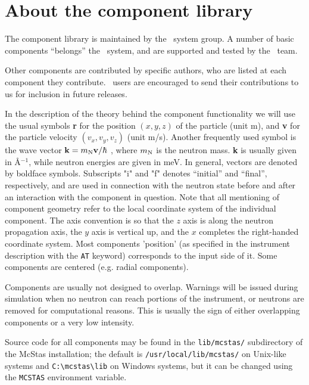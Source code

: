 
\chapter{About the component library}
\label{c:components}
The component library is
maintained by the \MCS\ system group. A number of basic components
``belongs'' the \MCS\ system, and are supported and tested by the \MCS\
team.

Other components are contributed
by specific authors, who are listed at each component
they contribute.
\MCS\ users are encouraged to send their
contributions to us for inclusion in future releases.

In the description of the theory behind the component functionality
we will use the usual symbols {\bf r} for the position
$(x,y,z)$ of the particle (unit m), and {\bf v} for
the particle velocity $(v_x, v_y, v_z)$ (unit m/s).
Another frequently used symbol is
the wave vector ${\bf k} = m_{\rm N} {\bf v}/\hbar$ , where
$m_{\rm N}$ is the neutron mass. {\bf k} is usually given in
\AA$^{-1}$, while neutron energies are given in meV.
In general, vectors are denoted by boldface symbols.
Subscripts "i" and "f" denotes ``initial'' and ``final'', respectively,
and are used in connection with the neutron state before and after
an interaction with the component in question.
Note that all mentioning of component geometry refer to
the local coordinate system of the individual component.
The axis convention is so that the $z$ axis is along
the neutron propagation axis, the $y$ axis is vertical up,
and the $x$ completes the right-handed coordinate system.
Most components 'position' (as specified in the instrument description with the \verb+AT+ keyword) corresponds to the input side of it. Some components are centered (e.g. radial components).

Components are usually not designed to overlap. Warnings will be issued during simulation when no neutron can reach portions of the instrument, or neutrons are removed for computational reasons. This is usually the sign of either overlapping components or a very low intensity.

Source code for all components may be found in the \verb+lib/mcstas/+
subdirectory of the McStas installation;
the default is \verb+/usr/local/lib/mcstas/+
on Unix-like systems and \verb+C:\mcstas\lib+ on Windows systems, but it can be
changed using the \verb+MCSTAS+ environment variable.


